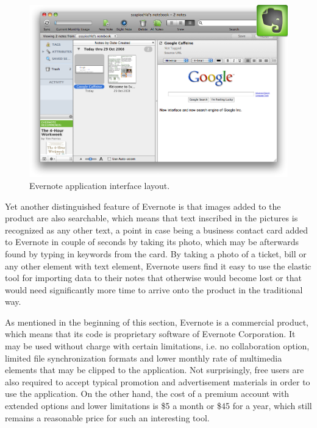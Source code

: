 \begin{figure}[ht]
\begin{center}
\includegraphics[scale=0.38]{img/evernote_demo.png}
\caption{Evernote application interface layout.}
\label{fig:evernote_demo}
\end{center}
\end{figure}
Yet another distinguished feature of Evernote is that images added to the product are also searchable, which means that text inscribed in the pictures is recognized as any other text, a point in case being a business contact card added to Evernote in couple of seconds by taking its photo, which may be afterwards found by typing in keywords from the card. By taking a photo of a ticket, bill or any other element with text element, Evernote users find it easy to use the elastic tool for importing data to their notes that otherwise would become lost or that would need significantly more time to arrive onto the product in the traditional way.

As mentioned in the beginning of this section, Evernote is a commercial product, which means that its code is proprietary software of Evernote Corporation. It may be used without charge with certain limitations, i.e. no collaboration option, limited file synchronization formats and lower monthly rate of multimedia elements that may be clipped to the application. Not surprisingly, free users are also required to accept typical promotion and advertisement materials in order to use the application. On the other hand, the cost of a premium account with extended options and lower limitations is \$5 a month or \$45 for a year, which still remains a reasonable price for such an interesting tool. 

